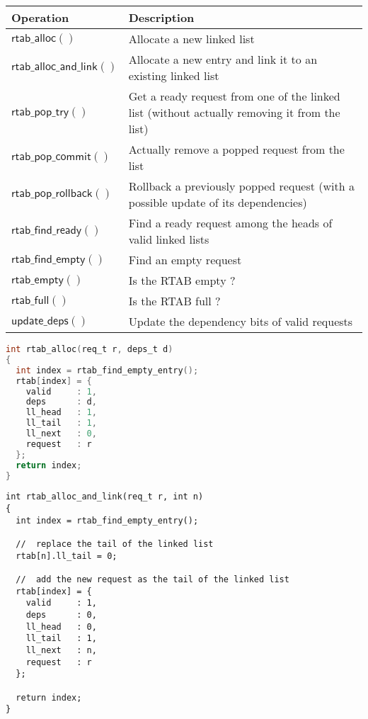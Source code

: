 \documentclass[10pt,titlepage,twoside]{book}
\begin{document}
\begin{tabular}{p{.30\linewidth}p{.70\linewidth}}
  \toprule
  \textbf{Operation}                  & \textbf{Description} \\
  \midrule
  $\mathsf{rtab\_alloc()}$            & Allocate a new linked list \\
  \midrule
  $\mathsf{rtab\_alloc\_and\_link()}$ & Allocate a new entry and link it to an existing linked list \\
  \midrule
  $\mathsf{rtab\_pop\_try()}$         & Get a ready request from one of the linked list (without actually removing it from the list) \\
  \midrule
  $\mathsf{rtab\_pop\_commit()}$      & Actually remove a popped request from the list \\
  \midrule
  $\mathsf{rtab\_pop\_rollback()}$    & Rollback a previously popped request (with a possible update of its dependencies) \\
  \midrule
  $\mathsf{rtab\_find\_ready()}$      & Find a ready request among the heads of valid linked lists \\
  \midrule
  $\mathsf{rtab\_find\_empty()}$      & Find an empty request \\
  \midrule
  $\mathsf{rtab\_empty()}$            & Is the RTAB empty ? \\
  \midrule
  $\mathsf{rtab\_full()}$             & Is the RTAB full ? \\
  \midrule
  $\mathsf{update\_deps()}$           & Update the dependency bits of valid requests \\
\end{tabular}

\begin{lstlisting}[language=c]
int rtab_alloc(req_t r, deps_t d)
{
  int index = rtab_find_empty_entry();
  rtab[index] = {
    valid     : 1,
    deps      : d,
    ll_head   : 1,
    ll_tail   : 1,
    ll_next   : 0,
    request   : r
  };
  return index;
}
\end{lstlisting}

\begin{lstlisting}
int rtab_alloc_and_link(req_t r, int n)
{
  int index = rtab_find_empty_entry();

  //  replace the tail of the linked list
  rtab[n].ll_tail = 0;

  //  add the new request as the tail of the linked list
  rtab[index] = {
    valid     : 1,
    deps      : 0,
    ll_head   : 0,
    ll_tail   : 1,
    ll_next   : n,
    request   : r
  };

  return index;
}
\end{lstlisting}
\end{document}
